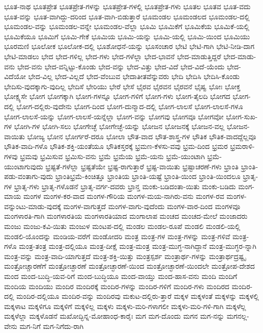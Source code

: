 {ಭೂತ-ನಾಥ
ಭೂತಪ್ರೇತ
ಭೂತಪ್ರೇತ-ಗಳನ್ನು
ಭೂತಪ್ರೇತ-ಗಳಲ್ಲಿ
ಭೂತಪ್ರೇತ-ಗಳು
ಭೂತಲ
ಭೂತವ
ಭೂತ-ವದು
ಭೂತ-ವನ್ನು
ಭೂತ-ವಾಗಿದ್ದು-ದರಿಂದ
ಭೂತ-ವಾಗಿ-ಬಿಡುತ್ತಾರೆ
ಭೂಮಂಡಲ
ಭೂಮಂಡಲದ
ಭೂಮಂಡಲ-ದಲ್ಲಿ
ಭೂಮಂಡಲ-ವನ್ನು
ಭೂಮಂಡಲ-ವನ್ನೇ
ಭೂಮಂಡಲ-ವೆಲ್ಲಾ
ಭೂಮಿ
ಭೂಮಿಕೆಗೆ
ಭೂಮಿಕೆಯ
ಭೂಮಿಕೆ-ಯಲ್ಲಿ
ಭೂಮಿಕೆಯೂ
ಭೂಮಿಗೆ
ಭೂಮಿ-ಗೇಕೆ
ಭೂಮಿಯ
ಭೂಮಿ-ಯನ್ನು
ಭೂಮಿ-ಯಲ್ಲಿ
ಭೂಮಿ-ಯಿಂದ
ಭೂಮಿಯು
ಭೂರಮಣಿ
ಭೂಲೋಕ
ಭೂಲೋಕ-ದಲ್ಲಿ
ಭೂಶೋಧನೆ-ಯನ್ನು
ಭೂಸಂಚಾರ
ಭೇಟಿ
ಭೇಟಿ-ಗಾಗಿ
ಭೇಟಿ-ನೀಡಿ-ದಾಗ
ಭೇಟಿ-ಮಾಡಲು
ಭೇದ
ಭೇದ-ಗಳಿಲ್ಲ
ಭೇದ-ಗಳು
ಭೇದ-ಗಳೆಲ್ಲಾ
ಭೇದ-ಭಾವನೆ
ಭೇದ-ಮಾಡುತ್ತಿದ್ದರೆ
ಭೇದ-ಮಾಡು-ವನು
ಭೇದ-ವನು
ಭೇದ-ವನ್ನಿಟ್ಟು-ಕೊಂಡು
ಭೇದ-ವನ್ನು
ಭೇದ-ವಿತ್ತು
ಭೇದ-ವಿದೆ
ಭೇದ-ವಿದೆ-ಯೆಂದು
ಭೇದ-ವಿದೆಯೋ
ಭೇದ-ವಿಲ್ಲ
ಭೇದ-ವಿಲ್ಲದೆ
ಭೇದ-ವೆಂಬುವ
ಭೇದಾತೀತವೆನ್ನುವರು
ಭೇದಿ
ಭೇದಿಸಿ
ಭೇದಿಸಿ-ಕೊಂಡು
ಭೇದಿಸು-ವುದಕ್ಕಾಗು-ವುದಿಲ್ಲ
ಭೇದಿಸೆ
ಭೇರಿಯು
ಭೇರೆ
ಭೇಸೆ
ಭೈರವ
ಭೈರವನ
ಭೈರವನೆ
ಭೈಷ್ವ
ಭೋಃ
ಭೋಕ್ತ
ಭೋಕ್ಷ್ಯಸೇ
ಭೋಗ
ಭೋಗಕ್ಕಾಗಿ
ಭೋಗ-ಗಳನ್ನೂ
ಭೋಗ-ಗಳಿಗೆ
ಭೋಗ-ಗಳು
ಭೋಗ-ತೈಲದಿ
ಭೋಗದ
ಭೋಗ-ದಲ್ಲಿ
ಭೋಗ-ದಲ್ಲಿರು-ವುದೇನು
ಭೋಗ-ದಿಂದ
ಭೋಗ-ದುನ್ಮಾದ-ದಲ್ಲಿ
ಭೋಗ-ಲಾಲಸೆ
ಭೋಗ-ಲಾಲಸೆ-ಗಳೂ
ಭೋಗ-ಲಾಲಸೆ-ಯನ್ನು
ಭೋಗ-ಲಾಲಸೆ-ಯನ್ನೆಲ್ಲಾ
ಭೋಗ-ವನ್ನು
ಭೋಗವು
ಭೋಗವೂ
ಭೋಗವೋ
ಭೋಗ-ಸುಖ-ಗಳ
ಭೋಗಿ-ಗಳ
ಭೋಗಿ-ಸಲು
ಭೋಗೇಚ್ಛೆ
ಭೋಗೇಚ್ಛೆ-ಯನ್ನು
ಭೋಜನ
ಭೋಜನಕ್ಕೆ
ಭೋಜನ-ವಲ್ಲ
ಭೋಜನ-ವಾಯಿತು
ಭೋಜ್ಯ
ಭೋನ
ಭೋರ್ಗರೆ-ದರೂ
ಭೋಲಾ
ಭೌತ-ವಾದ
ಭೌತ-ಶಾಸ್ತ್ರ-ಗಳ
ಭೌತಿಕ
ಭೌತಿಕ-ವಾದದ್ದೆಲ್ಲವೂ
ಭೌತಿಕ-ವಾದಿ-ಗಳೊ
ಭೌತಿಕ-ಶಕ್ತಿ-ಯಂತೆಯೂ
ಭೌತಿಕಸ್ತರಕ್ಕೆ
ಭ್ರಮಣ-ಕೆಳಸು-ವವು
ಭ್ರಮ-ದಿಂದ
ಭ್ರಮರ
ಭ್ರಮರಾಳಿ-ಗಳವು
ಭ್ರಮವು
ಭ್ರಮಿಸುವ
ಭ್ರಮಿಸು-ವನು
ಭ್ರಮೆ
ಭ್ರಮೆಯ
ಭ್ರಮೆ-ಯನು
ಭ್ರಮೆ-ಯುಂಟಾಗಿ
ಭ್ರಮೆ-ಯುಂಟಾಗುವುದು
ಭ್ರಷ್ಟತೆ-ಗಳೆಲ್ಲಾ
ಭ್ರಷ್ಟತೆಯೇ
ಭ್ರಷ್ಟ-ರಾಗುತ್ತಾರೆ
ಭ್ರಷ್ಟ-ವಾಯಿತು
ಭ್ರಷ್ಟಾಚರಣೆ-ಗಳು
ಭ್ರಾಂತಿ
ಭ್ರಾಂತಿ-ಪಡು-ವಂತಾಗು-ವುದು
ಭ್ರಾಂತಿಭ್ರಮೆ-ಕಿಂಚಿತ್ತೂ
ಭ್ರಾಂತಿಯ
ಭ್ರಾಂತಿ-ಯಷ್ಟೆ
ಭ್ರಾಂತಿ-ಯಿಂದ
ಭ್ರಾಂತಿ-ಯಿಂದಲೂ
ಭ್ರಾತೃ-ಗಳ
ಭ್ರಾತೃ-ಗಳು
ಭ್ರಾತೃ-ಗಳೊಡನೆ
ಭ್ರಾತೃ-ವರ್ಗ-ದವರು
ಭ್ರಾನ್ತ
ಮಂಕು-ಬಡಿದಂತಾ-ಯಿತು
ಮಂಕು-ಬಡಿದು
ಮಂಗ-ಮಾಯ
ಮಂಗಳ
ಮಂಗಳ-ಕರ-ವಾದ
ಮಂಗಳ-ಗೌರಿಯ
ಮಂಗಳ-ಮಯ-ನಾಗಿರು-ವನು
ಮಂಗಳ-ರವ
ಮಂಗಳ-ವನ್ನುಂಟು-ಮಾಡು-ವುದಕ್ಕೆ
ಮಂಗಳ-ವಾಗುತ್ತದೆ
ಮಂಗಳ-ವಾಗು-ವುದೆಂದು
ಮಂಗಳ-ವಾರ-ದಿಂದ
ಮಂಗಳವೂ
ಮಂಗಳಾರತಿ-ಗಾಗಿ
ಮಂಗಳಾರತಿಯ
ಮಂಗಳಾರತಿಯಾದ
ಮಂಗಾಲಾಪ
ಮಂಚದ
ಮಂಚದ-ಮೇಲೆ
ಮಂಜಾದರು
ಮಂಜು
ಮಂಜು-ಕವಿ-ಯಿತು
ಮಂಜುಳ
ಮಂಟಪ-ದಲ್ಲಿ
ಮಂಡಲ
ಮಂಡಲ-ರೂಪೆ
ಮಂಡಲಿ
ಮಂಡಲಿ-ಯಲ್ಲಿ
ಮಂಡಲಿ-ಯೊಂದನ್ನು
ಮಂಡಿಯ-ವರೆಗೆ
ಮಂಡೋದರಿ
ಮಂತ್ರ
ಮಂತ್ರ-ಗಳ
ಮಂತ್ರ-ಗಳನ್ನು
ಮಂತ್ರ-ಗಳಿವೆ
ಮಂತ್ರ-ಗಳೊ
ಮಂತ್ರ-ತಂತ್ರ
ಮಂತ್ರ-ದಲ್ಲಿಯೂ
ಮಂತ್ರ-ದೀಕ್ಷೆ
ಮಂತ್ರ-ಮಂತ್ರ
ಮಂತ್ರ-ಮುಗ್ಧ-ನಾಗಿದ್ದಾನೆ
ಮಂತ್ರ-ಮುಗ್ಧರ-ನ್ನಾಗಿ
ಮಂತ್ರ-ವನ್ನು
ಮಂತ್ರ-ವಾದಿ-ಯಾಗುತ್ತದೆ
ಮಂತ್ರ-ಶಕ್ತಿ-ಯಿತ್ತು
ಮಂತ್ರಸ್ಪರ್ಶ
ಮಂತ್ರಾರ್ಥ-ಗಳನ್ನು
ಮಂತ್ರಾರ್ಥದ್ರಷ್ಟೃ
ಮಂತ್ರೋಚ್ಚಾರಣೆಗೆ
ಮಂತ್ರೋಚ್ಛಾರಣೆ
ಮಂತ್ರೋಚ್ಛಾರಣೆ-ಯಿಂದ
ಮಂತ್ರೋಚ್ಛಾರಣೆ-ಯಿಂದಲೇ
ಮಂತ್ರೋಪ-ದೇಶದ
ಮಂದ
ಮಂದ-ಬುದ್ಧಿ-ಯವ-ರಿಗೆ
ಮಂದ-ಬುದ್ಧಿಯೂ
ಮಂದ-ವಾಯ್ತು
ಮಂದ-ಹಾಸ-ವನು
ಮಂದಿ
ಮಂದಿಗೆ
ಮಂದಿಯ
ಮಂದಿಯು
ಮಂದಿರ
ಮಂದಿರಕ್ಕೆ
ಮಂದಿರ-ಗಳನ್ನು
ಮಂದಿರ-ಗಳಿಗೆ
ಮಂದಿರ-ಗಳು
ಮಂದಿರದ
ಮಂದಿರ-ದಲ್ಲಿ
ಮಂದಿರ-ದಲ್ಲಿಯೂ
ಮಂದಿರ-ವನ್ನು
ಮಂದಿರವು
ಮಕುಟ-ದಲ್ಲಿರು-ತ್ತಾರೆ
ಮಕ್ಕಳ
ಮಕ್ಕಳಂತೆ
ಮಕ್ಕಳನ್ನು
ಮಕ್ಕಳಲ್ಲಿ
ಮಕ್ಕಳಾಟ
ಮಕ್ಕಳಿಗೂ
ಮಕ್ಕಳಿಗೆ
ಮಕ್ಕಳಿಲ್ಲ
ಮಕ್ಕಳು
ಮಕ್ಕಳು-ಮರಿ-ಗಳಾಗಲೀ
ಮಕ್ಕಳು-ಮರಿ-ಗಳಿ-ಗಾಗಿ
ಮಕ್ಕಳೆಲ್ಲ
ಮಕ್ಕಳೆಲ್ಲಾ
ಮಕ್ಕಳೊಡನೆ
ಮಖೋದ್ಭಿನ್ನ-ಮೋಹಾಂಧ-ಕಾರೈಃ
ಮಗ
ಮಗ-ದೊಂದು
ಮಗನ
ಮಗ-ನನ್ನು
ಮಗನಲ್ಲ-ವೇನು
ಮಗ-ನಿಗೆ
ಮಗ-ನಿಗೆದು-ರಾಗಿ
}
